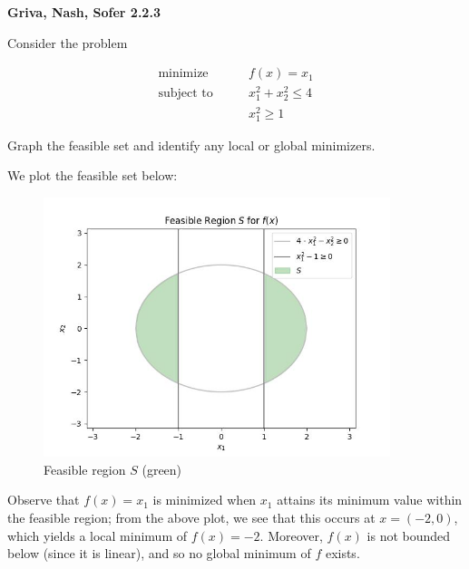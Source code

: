 \textbf{Griva, Nash, Sofer 2.2.3}

Consider the problem

\begin{align*}
  \text{minimize}   \qquad & f(x) = x_1 \\
  \text{subject to} \qquad & x_1^2 + x_2^2 \le 4 \\
                    \qquad & x_1^2 \ge 1
\end{align*}

Graph the feasible set and identify any local or global minimizers.

\begin{solution}
  We plot the feasible set below:

  \begin{figure}[h]
    \centering
    \includegraphics[width=0.9\textwidth]{problem_2.jpg}
    \caption{Feasible region $S$ (green)}
  \end{figure}

  Observe that $f(x) = x_1$ is minimized when $x_1$ attains its minimum value within the feasible region; from the above
  plot, we see that this occurs at $x = (-2, 0)$, which yields a local minimum of $f(x) = -2$. Moreover, $f(x)$ is not 
  bounded below (since it is linear), and so no global minimum of $f$ exists.
  \ \\
\end{solution}